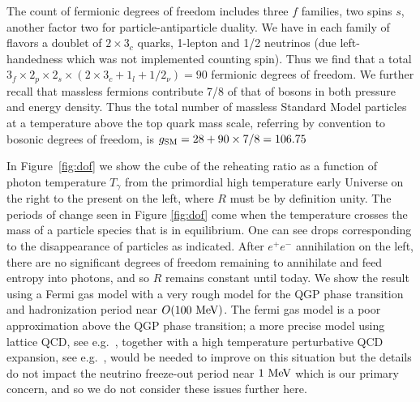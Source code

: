 The count of fermionic degrees of freedom includes three $f$ families, two spins $s$, another factor two for particle-antiparticle duality. We have in each family of flavors a doublet of $2\times 3_c$ quarks, 1-lepton and 1/2 neutrinos (due left-handedness which was not implemented counting spin). Thus we find that a total $3_f\times 2_p\times 2_s\times(2\times 3_c+1_l+1/2_\nu)=90$ fermionic degrees of freedom. We further recall that massless fermions contribute 7/8 of that of bosons in both pressure and energy density. Thus the total number of massless Standard Model particles at a temperature above the top quark mass scale, referring by convention to bosonic degrees of freedom, is $g_{\rm SM}=28+90\times 7/8=106.75$ 



In Figure~\ref{fig:dof} we show the cube of the reheating ratio  as a function of photon temperature $T_\gamma$ from the primordial high temperature early Universe on the right to the present on the left, where $R$ must be by definition unity. The periods of change seen in Figure \ref{fig:dof} come when the temperature crosses the mass of a particle species that is in equilibrium. One can see drops corresponding to the disappearance of particles as indicated. After $e^+e^-$ annihilation on the left, there are no significant degrees of freedom remaining to annihilate and feed entropy into photons, and so $R$ remains constant until today. We show the result using a Fermi gas model with a very rough model for the QGP phase transition and hadronization period near $O(100\text{ MeV})$. The fermi gas model is a poor approximation above the QGP phase transition; a more precise model using lattice QCD, see e.g.~\cite{Borsanyi:2013bia}, together with a high temperature perturbative QCD expansion, see e.g.~\cite{letessier2002hadrons}, would be needed to improve on this situation but the details do not impact the neutrino freeze-out period near $1\text{ MeV}$ which is our primary concern, and so we do not consider these issues further here.

